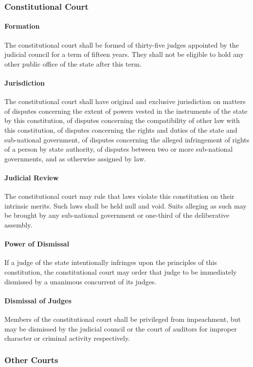 \documentclass{article}
\begin{document}
\subsubsection{Constitutional Court}
\paragraph{Formation}
The constitutional court shall be formed of thirty-five judges appointed by the judicial council for a term of fifteen years. They shall not be eligible to hold any other public office of the state after this term.
\paragraph{Jurisdiction}
The constitutional court shall have original and exclusive jurisdiction on matters of disputes concerning the extent of powers vested in the instruments of the state by this constitution, of disputes concerning the compatibility of other law with this constitution, of disputes concerning the rights and duties of the state and sub-national government, of disputes concerning the alleged infringement of rights of a person by state authority, of disputes between two or more sub-national governments, and as otherwise assigned by law.
\paragraph{Judicial Review}
The constitutional court may rule that laws violate this constitution on their intrinsic merits. Such laws shall be held null and void. Suits alleging as such may be brought by any sub-national government or one-third of the deliberative assembly.
\paragraph{Power of Dismissal}
If a judge of the state intentionally infringes upon the principles of this constitution, the constitutional court may order that judge to be immediately dismissed by a unanimous concurrent of its judges.
\paragraph{Dismissal of Judges}
Members of the constitutional court shall be privileged from impeachment, but may be dismissed by the judicial council or the court of auditors for improper character or criminal activity respectively.
\subsubsection{Other Courts}
\end{document}
